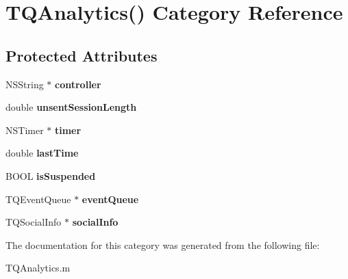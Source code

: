 \hypertarget{category_t_q_analytics_07_08}{}\section{T\+Q\+Analytics() Category Reference}
\label{category_t_q_analytics_07_08}
\subsection*{Protected Attributes}
\begin{DoxyCompactItemize}
\item 
\hypertarget{category_t_q_analytics_07_08_acbc6c029260e9cf5d8727cc9fa4078f5}{}N\+S\+String $\ast$ {\bfseries controller}\label{category_t_q_analytics_07_08_acbc6c029260e9cf5d8727cc9fa4078f5}

\item 
\hypertarget{category_t_q_analytics_07_08_a8b0e6aeb25af63547e61f7099689ab19}{}double {\bfseries unsent\+Session\+Length}\label{category_t_q_analytics_07_08_a8b0e6aeb25af63547e61f7099689ab19}

\item 
\hypertarget{category_t_q_analytics_07_08_aa785b246cb64a8d2e15ff03505903e4c}{}N\+S\+Timer $\ast$ {\bfseries timer}\label{category_t_q_analytics_07_08_aa785b246cb64a8d2e15ff03505903e4c}

\item 
\hypertarget{category_t_q_analytics_07_08_a9f58f193913088c83d7b6e881e8b3af0}{}double {\bfseries last\+Time}\label{category_t_q_analytics_07_08_a9f58f193913088c83d7b6e881e8b3af0}

\item 
\hypertarget{category_t_q_analytics_07_08_a8c68953b32c9d61cd3ee042d23dc153e}{}B\+O\+O\+L {\bfseries is\+Suspended}\label{category_t_q_analytics_07_08_a8c68953b32c9d61cd3ee042d23dc153e}

\item 
\hypertarget{category_t_q_analytics_07_08_a041b5bc2f50e6ae878aaf1dad0c34f7d}{}T\+Q\+Event\+Queue $\ast$ {\bfseries event\+Queue}\label{category_t_q_analytics_07_08_a041b5bc2f50e6ae878aaf1dad0c34f7d}

\item 
\hypertarget{category_t_q_analytics_07_08_af7832fb2fba23062f43347ae5c731724}{}T\+Q\+Social\+Info $\ast$ {\bfseries social\+Info}\label{category_t_q_analytics_07_08_af7832fb2fba23062f43347ae5c731724}

\end{DoxyCompactItemize}


The documentation for this category was generated from the following file\+:\begin{DoxyCompactItemize}
\item 
T\+Q\+Analytics.\+m\end{DoxyCompactItemize}
